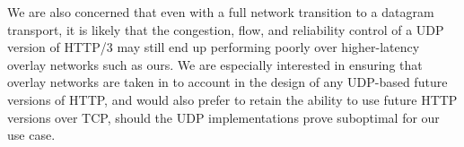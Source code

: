 \documentclass[letterpaper,11pt]{llncs}
\begin{document}
We are also concerned that even with a full network transition to a datagram
transport, it is likely that the congestion, flow, and reliability control of
a UDP version of HTTP/3 may still end up performing poorly over higher-latency
overlay networks such as ours. We are especially interested in ensuring that
overlay networks are taken in to account in the design of any UDP-based future
versions of HTTP, and would also prefer to retain the ability to use future
HTTP versions over TCP, should the UDP implementations prove suboptimal for
our use case.



 

\clearpage
\appendix
\end{document}
